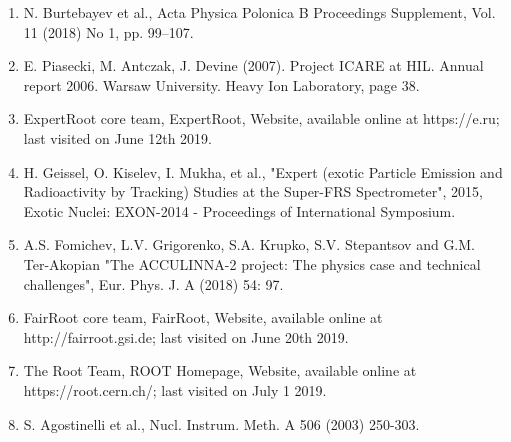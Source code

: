 \documentclass[%
 aip,
cp,  %
 amsmath,amssymb,%
 reprint,%
]{revtex4-2}
\begin{document}
\begin{enumerate}
\item N. Burtebayev et al., Acta Physica Polonica B Proceedings Supplement, Vol. 11 (2018) No 1, pp. 99–107.
\item E. Piasecki, M. Antczak, J. Devine (2007). Project ICARE at HIL. Annual report 2006. Warsaw University. Heavy       Ion Laboratory, page 38.
\item ExpertRoot core team, ExpertRoot, Website, available online at https://e.ru; last visited on June 12th 2019.
\item H. Geissel, O. Kiselev, I. Mukha, et al., "Expert (exotic Particle Emission and Radioactivity by Tracking) Studies at the Super-FRS Spectrometer", 2015, Exotic Nuclei: EXON-2014 - Proceedings of International Symposium.
\item A.S. Fomichev, L.V. Grigorenko, S.A. Krupko, S.V. Stepantsov and G.M. Ter-Akopian "The ACCULINNA-2 project: The physics case and technical challenges", Eur. Phys. J. A (2018) 54: 97.
\item FairRoot core team, FairRoot, Website, available online at http://fairroot.gsi.de; last visited on June 20th 2019.
\item The Root Team, ROOT Homepage, Website, available online at https://root.cern.ch/; last visited on July 1 2019.
\item S. Agostinelli et al., Nucl. Instrum. Meth. A 506 (2003) 250-303.

\end{enumerate}
\end{document}
